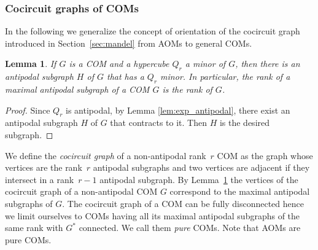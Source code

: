 \documentclass[final,11pt]{article}
\newtheorem{lem}[thm]{Lemma}%
\begin{document}
\subsubsection*{Cocircuit graphs of COMs}
In the following we generalize the concept of orientation of the cocircuit graph introduced in Section~\ref{sec:mandel} from AOMs to general COMs. 

\begin{lem}\label{lem:rankofcell}
 If $G$ is a COM and a hypercube $Q_r$ a minor of $G$, then there is an antipodal subgraph $H$ of $G$ that has a $Q_r$  minor. In particular, the rank of a maximal antipodal subgraph of a COM $G$ is the rank of $G$.
\end{lem}
\begin{proof}
Since $Q_r$ is antipodal, by Lemma \ref{lem:exp_antipodal}, there exist an antipodal subgraph $H$ of $G$ that contracts to it. Then $H$ is the desired subgraph.
\end{proof}

We define the \emph{cocircuit graph} of a non-antipodal rank~$r$ COM as the graph whose vertices are the rank~$r$ antipodal subgraphs and two vertices are adjacent if they intersect in a rank~$r-1$ antipodal subgraph. By Lemma~\ref{lem:rankofcell} the vertices of the cocircuit graph of a non-antipodal COM $G$ correspond  to the maximal antipodal subgraphs of $G$. The cocircuit graph of a COM can be fully disconnected hence we limit ourselves to COMs having all its maximal antipodal subgraphs of the same rank with $G^*$ connected. We call them \emph{pure} COMs. Note that AOMs are pure COMs.

 
\end{document}
